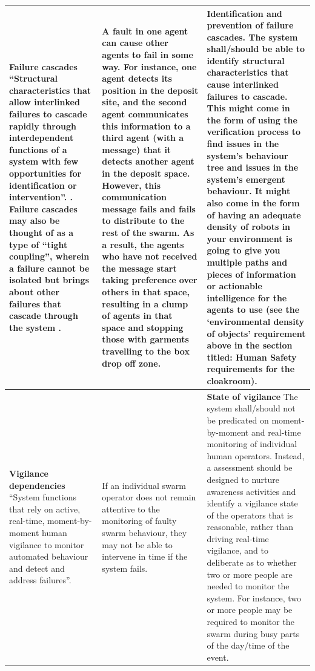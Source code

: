 \documentclass[lettersize,journal]{IEEEtran}
\begin{document}
\begin{landscape}
\begin{table}[]
\begin{tabular}{|p{0.3\textheight}|p{0.35\textheight}|p{0.35\textheight}|}
\textbf{Failure cascades} ``Structural characteristics that allow interlinked failures to cascade rapidly through interdependent functions of a system with few opportunities for identification or intervention”. \cite{macrae2021learning}. Failure cascades may also be thought of as a type of ``tight coupling”, wherein a failure cannot be isolated but brings about other failures that cascade through the system \cite{perrow1999normal}. & A fault in one agent can cause other agents to fail in some way. For instance, one agent detects its position in the deposit site, and the second agent communicates this information to a third agent (with a message) that it detects another agent in the deposit space. However, this communication message fails and fails to distribute to the rest of the swarm. As a result, the agents who have not received the message start taking preference over others in that space, resulting in a clump of agents in that space and stopping those with garments travelling to the box drop off zone. & \textbf{Identification and prevention of failure cascades.} The system shall/should be able to identify structural characteristics that cause interlinked failures to cascade. This might come in the form of using the verification process to find issues in the system’s behaviour tree and issues in the system’s emergent behaviour. It might also come in the form of having an adequate density of robots in your environment is going to give you multiple paths and pieces of information or actionable intelligence for the agents to use (see the ‘environmental density of objects’ requirement above in the section titled: Human Safety requirements for the cloakroom).\\
\hline
\textbf{Vigilance dependencies}
``System functions that rely on active, real-time, moment-by-moment human vigilance to monitor automated behaviour and detect and address failures”. \cite{macrae2021learning} & If an individual swarm operator does not remain attentive to the monitoring of faulty swarm behaviour, they may not be able to intervene in time if the system fails. & \textbf{State of vigilance}
The system shall/should not be predicated on moment-by-moment and real-time monitoring of individual human operators. Instead, a assessment should be designed to nurture awareness activities and identify a vigilance state of the operators that is reasonable, rather than driving real-time vigilance, and to deliberate as to whether two or more people are needed to monitor the system. For instance, two or more people may be required to monitor the swarm during busy parts of the day/time of the event.\\

\end{tabular}
\end{table}
\end{landscape}
\end{document}
